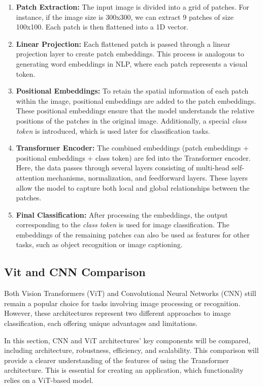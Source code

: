\begin{enumerate}
    \item \textbf{Patch Extraction:} The input image is divided into a grid of patches. For instance, if the image size is 300x300, we can extract 9 patches of size 100x100. Each patch is then flattened into a 1D vector.
    \item \textbf{Linear Projection:} Each flattened patch is passed through a linear projection layer to create patch embeddings. This process is analogous to generating word embeddings in NLP, where each patch represents a visual token.
    \item \textbf{Positional Embeddings:} To retain the spatial information of each patch within the image, positional embeddings are added to the patch embeddings. These positional embeddings ensure that the model understands the relative positions of the patches in the original image. Additionally, a special \textit{class token} is introduced, which is used later for classification tasks.
    \item \textbf{Transformer Encoder:} The combined embeddings (patch embeddings + positional embeddings + class token) are fed into the Transformer encoder. Here, the data passes through several layers consisting of multi-head self-attention mechanisms, normalization, and feedforward layers. These layers allow the model to capture both local and global relationships between the patches.
    \item \textbf{Final Classification:} After processing the embeddings, the output corresponding to the \textit{class token} is used for image classification. The embeddings of the remaining patches can also be used as features for other tasks, such as object recognition or image captioning.
\end{enumerate}

\subsection*{Vit and CNN Comparison}
\label{sec:vit-cnn-comparison}

Both Vision Transformers (ViT) and Convolutional Neural Networks (CNN) still remain a popular choice for tasks involving image processing or recognition. However, these architectures represent two different approaches to image classification, each offering unique advantages and limitations. 

\medskip

In this section, CNN and ViT architectures' key components will be compared, including architecture, robustness, efficiency, and scalability. This comparison will provide a clearer understanding of the features of using the Transformer architecture. This is essential for creating an application, which functionality relies on a ViT-based model.

